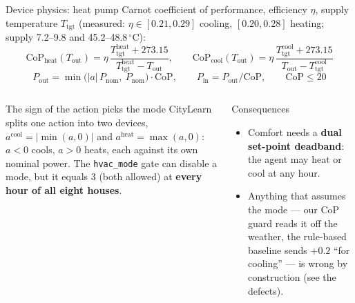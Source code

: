 \documentclass[aspectratio=169,10pt]{beamer}
\begin{document}
\begin{frame}{Device physics: heat pump}
\small
Carnot coefficient of performance, efficiency $\eta$, supply temperature $T_{\text{tgt}}$ (measured: $\eta \in [0.21, 0.29]$ cooling, $[0.20, 0.28]$ heating; supply 7.2--9.8 and 45.2--48.8\,$^\circ$C):
\[
\mathrm{CoP}_{\text{heat}}(T_{\text{out}}) = \eta\,\frac{T^{\text{heat}}_{\text{tgt}} + 273.15}{T^{\text{heat}}_{\text{tgt}} - T_{\text{out}}},
\qquad
\mathrm{CoP}_{\text{cool}}(T_{\text{out}}) = \eta\,\frac{T^{\text{cool}}_{\text{tgt}} + 273.15}{T_{\text{out}} - T^{\text{cool}}_{\text{tgt}}}
\]
\[
P_{\text{out}} = \min\big(|a|\,P_{\text{nom}},\ P_{\text{nom}}\big)\cdot \mathrm{CoP},
\qquad
P_{\text{in}} = P_{\text{out}} / \mathrm{CoP}, \qquad \mathrm{CoP} \le 20
\]
\begin{columns}[T]
\begin{alertblock}{The sign of the action picks the mode}
CityLearn splits one action into two devices,
$a^{\text{cool}} = |\min(a, 0)|$ and $a^{\text{heat}} = \max(a, 0)$: $a<0$ cools, $a>0$ heats, each against its own nominal power. The \texttt{hvac\_mode} gate can disable a mode, but it equals 3 (both allowed) at \textbf{every hour of all eight houses}.
\end{alertblock}
\begin{block}{Consequences}
\begin{itemize}
  \item Comfort needs a \textbf{dual set-point deadband}: the agent may heat or cool at any hour.
  \item Anything that assumes the mode --- our CoP guard reads it off the weather, the rule-based baseline sends $+0.2$ ``for cooling'' --- is wrong by construction (see the defects).
\end{itemize}
\end{block}
\end{columns}
\end{frame}
\end{document}
